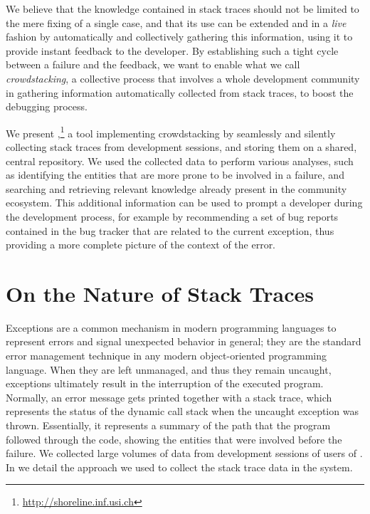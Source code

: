 We believe that the knowledge contained in stack traces should not be limited to the mere fixing of a single case, and that its use can be extended and in a \emph{live} fashion by automatically and collectively gathering this information, using it to provide instant feedback to the developer.
By establishing such a tight cycle between a failure and the feedback, we want to enable what we call \emph{crowdstacking}, a collective process that involves a whole development community in gathering information automatically collected from stack traces, to boost the debugging process.

We present \slr,\footnote{\url{http://shoreline.inf.usi.ch}} a tool implementing crowdstacking by seamlessly and silently collecting stack traces from development sessions, and storing them on a shared, central repository.
We used the collected data to perform various analyses, such as identifying the entities that are more prone to be involved in a failure, and searching and retrieving relevant knowledge already present in the community ecosystem.
This additional information can be used to prompt a developer during the development process, for example by recommending  a set of bug reports contained in the bug tracker that are related to the current exception, thus providing a more complete picture of the context of the error.



\section{On the Nature of Stack Traces} \label{sec:stacktraces-nature}

Exceptions are a common mechanism in modern programming languages to represent errors and signal unexpected behavior in general; they are the standard error management technique in any modern object-oriented programming language.
When they are left unmanaged, and thus they remain uncaught, exceptions ultimately result in the interruption of the executed program.
Normally, an error message gets printed together with a stack trace, which represents the status of the dynamic call stack when the uncaught exception was thrown.
Essentially, it represents a summary of the path that the program followed through the code, showing the entities that were involved before the failure.
We collected large volumes of data from development sessions of users of \pha.
In  we detail the approach we used to collect the stack trace data in the \pha system.



